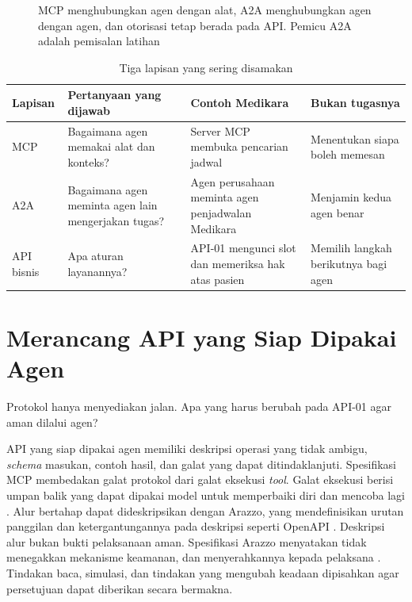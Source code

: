 \begin{figure}[!htb]
  \centering
  \resizebox{0.94\textwidth}{!}{}
  \caption{MCP menghubungkan agen dengan alat, A2A menghubungkan agen dengan agen, dan otorisasi tetap berada pada API. Pemicu A2A adalah pemisalan latihan}
  \label{fig:ch14-mcp-a2a}
\end{figure}

\begin{table}[!htb]
  \centering
  \caption{Tiga lapisan yang sering disamakan}
  \label{tab:ch14-protokol}
  \footnotesize
  \begin{tabularx}{\textwidth}{H{1.7cm}GGG}
    \hline
    \textbf{Lapisan} & \textbf{Pertanyaan yang dijawab} & \textbf{Contoh Medikara} & \textbf{Bukan tugasnya} \\ \hline
    MCP & Bagaimana agen memakai alat dan konteks? & Server MCP membuka pencarian jadwal & Menentukan siapa boleh memesan \\ \hline
    A2A & Bagaimana agen meminta agen lain mengerjakan tugas? & Agen perusahaan meminta agen penjadwalan Medikara & Menjamin kedua agen benar \\ \hline
    API bisnis & Apa aturan layanannya? & API-01 mengunci slot dan memeriksa hak atas pasien & Memilih langkah berikutnya bagi agen \\ \hline
  \end{tabularx}
\end{table}

\section{Merancang API yang Siap Dipakai Agen}

Protokol hanya menyediakan jalan. Apa yang harus berubah pada API-01 agar aman dilalui agen?

API yang siap dipakai agen memiliki deskripsi operasi yang tidak ambigu, \textit{schema} masukan, contoh hasil, dan galat yang dapat ditindaklanjuti. Spesifikasi MCP
membedakan galat protokol dari galat eksekusi \textit{tool}. Galat eksekusi berisi umpan balik yang dapat dipakai model untuk memperbaiki diri dan mencoba lagi
\cite{c14-mcp-tools}. Alur bertahap dapat dideskripsikan dengan Arazzo, yang mendefinisikan urutan panggilan dan ketergantungannya pada deskripsi seperti OpenAPI
\cite{openapi32, c14-arazzo}. Deskripsi alur bukan bukti pelaksanaan aman. Spesifikasi Arazzo menyatakan tidak menegakkan mekanisme keamanan, dan menyerahkannya kepada
pelaksana \cite{c14-arazzo}. Tindakan baca, simulasi, dan tindakan yang mengubah keadaan dipisahkan agar persetujuan dapat diberikan secara bermakna.

